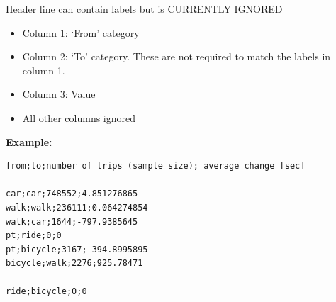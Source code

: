 Header line can contain labels but is CURRENTLY IGNORED

\begin{itemize}
\tightlist
\item
  Column 1: `From' category
\item
  Column 2: `To' category. These are not required to match the labels in
  column 1.
\item
  Column 3: Value
\item
  All other columns ignored
\end{itemize}

\textbf{Example:}

\begin{lstlisting}
from;to;number of trips (sample size); average change [sec]

car;car;748552;4.851276865
walk;walk;236111;0.064274854
walk;car;1644;-797.9385645
pt;ride;0;0
pt;bicycle;3167;-394.8995895
bicycle;walk;2276;925.78471

ride;bicycle;0;0
\end{lstlisting}
